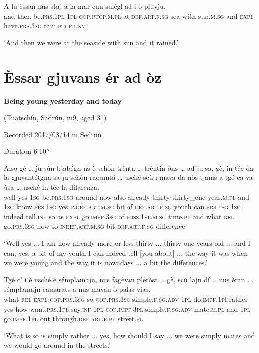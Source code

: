 \begin{linenumbers}
	\gll  A lu èssan nus staj á la mar cun sulégl ad i ò pluvju.   \\
	and then be.\textsc{prs.1pl} \textsc{1pl} \textsc{cop.ptcp.m.pl} at \textsc{def.art.f.sg} sea with sun.\textsc{m.sg} and \textsc{expl} have.\textsc{prs.3sg} rain.\textsc{ptcp.unm}\\
\end{linenumbers}
\medskip
\glt `And then we were at the seaside with sun and it rained.'
\medskip


\section{Èssar gjuvans ér ad òz}

\noindent
\textbf{Being young yesterday and today}

\noindent
(Tuatschín, Sadrún, m9, aged 31)

\noindent
Recorded 2017/03/14 in Sedrun

\noindent
Duration 6'10''

\bigskip

\begin{linenumbers}
	\gll Also gè … ju sùn bjabégn ùs è schòn trènta … trèntín òns … ad ju sa, gè, in téc da la gjuvantétgna sa ju schòn raquintá … usché scù i mava da nòs tjams a tgé ca va ùsa … usché in téc la difarènza.\\
	well yes {} \textsc{1sg} be.\textsc{prs.1sg} around now also already thirty {} thirty\_one year.\textsc{m.pl} {} and \textsc{1sg} know.\textsc{prs.1sg} yes \textsc{indef.art.m.sg} bit of \textsc{def.art.f.sg} youth can.\textsc{prs.1sg} \textsc{1sg} indeed tell.\textsc{inf} {} so as \textsc{expl} go.\textsc{impf.3sg} of \textsc{poss.1pl.m.sg} time.\textsc{pl} and what \textsc{rel} go.\textsc{prs.3sg} now {} so \textsc{indef.art.m.sg} bit \textsc{def.art.f.sg} difference\\
\end{linenumbers}
\medskip
\glt `Well yes ... I am now already more or less thirty ... thirty one years old ... and I can, yes, a bit of my youth I can indeed tell [you about] ... the way it was when we were young and the way it is nowadays ... a bit the differences.'
\medskip

\begin{linenumbers}
	\gll Tgé c’ i è usché è sémplamajn, nus fagèvan plét\underline{ò}st … gè, scù lajn dí … nuṣ èran ... sémplamajn camarats a nus mavan ò palas vias.    \\
	what \textsc{rel} \textsc{expl} \textsc{cop.prs.3sg} so \textsc{cop.prs.3sg} simple.\textsc{f.sg.adv} \textsc{1pl} do.\textsc{impf.1p}l rather {} yes how want.\textsc{prs.1pl} say.\textsc{inf} {} \textsc{1pl} \textsc{cop.impf.3pl} {} simple.\textsc{f.sg.adv} mate.\textsc{m.pl} and \textsc{1pl} go.\textsc{impf.1pl} out through.\textsc{def.art.f.pl} street.\textsc{pl}\\
\end{linenumbers}
\medskip
\glt `What is so is simply rather ... yes, how should I say ... we were simply mates and we would go around in the streets.'
\medskip

